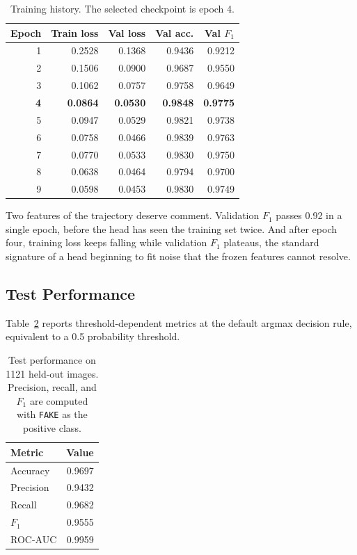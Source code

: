 \documentclass[conference]{IEEEtran}
\begin{document}
\begin{table}[t]
\caption{Training history. The selected checkpoint is epoch 4.}
\label{tab:history}
\centering
\small
\begin{tabular}{@{}rrrrr@{}}
\toprule
\textbf{Epoch} & \textbf{Train loss} & \textbf{Val loss} &
\textbf{Val acc.} & \textbf{Val $F_1$} \\
\midrule
1 & 0.2528 & 0.1368 & 0.9436 & 0.9212 \\
2 & 0.1506 & 0.0900 & 0.9687 & 0.9550 \\
3 & 0.1062 & 0.0757 & 0.9758 & 0.9649 \\
\textbf{4} & \textbf{0.0864} & \textbf{0.0530} & \textbf{0.9848} &
\textbf{0.9775} \\
5 & 0.0947 & 0.0529 & 0.9821 & 0.9738 \\
6 & 0.0758 & 0.0466 & 0.9839 & 0.9763 \\
7 & 0.0770 & 0.0533 & 0.9830 & 0.9750 \\
8 & 0.0638 & 0.0464 & 0.9794 & 0.9700 \\
9 & 0.0598 & 0.0453 & 0.9830 & 0.9749 \\
\bottomrule
\end{tabular}
\end{table}

Two features of the trajectory deserve comment. Validation $F_1$ passes 0.92 in
a single epoch, before the head has seen the training set twice. And after epoch
four, training loss keeps falling while validation $F_1$ plateaus, the standard
signature of a head beginning to fit noise that the frozen features cannot
resolve.

\subsection{Test Performance}

Table~\ref{tab:metrics} reports threshold-dependent metrics at the default
argmax decision rule, equivalent to a 0.5 probability threshold.

\begin{table}[t]
\caption{Test performance on 1121 held-out images. Precision, recall, and $F_1$
are computed with \texttt{FAKE} as the positive class.}
\label{tab:metrics}
\centering
\small
\begin{tabular}{@{}lr@{}}
\toprule
\textbf{Metric} & \textbf{Value} \\
\midrule
Accuracy   & 0.9697 \\
Precision  & 0.9432 \\
Recall     & 0.9682 \\
$F_1$      & 0.9555 \\
ROC-AUC    & 0.9959 \\
\bottomrule
\end{tabular}
\end{table}
\end{document}
